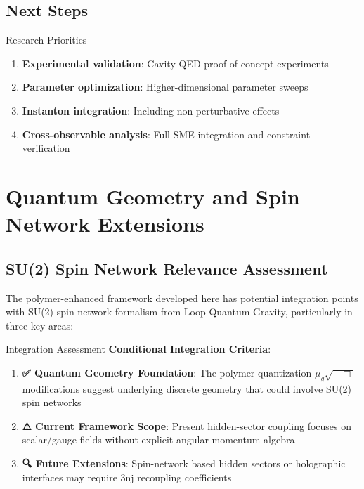 \documentclass[12pt]{article}
\begin{document}
\subsection{Next Steps}

\begin{warningbox}{Research Priorities}
\begin{enumerate}
\item \textbf{Experimental validation}: Cavity QED proof-of-concept experiments
\item \textbf{Parameter optimization}: Higher-dimensional parameter sweeps
\item \textbf{Instanton integration}: Including non-perturbative effects
\item \textbf{Cross-observable analysis}: Full SME integration and constraint verification
\end{enumerate}
\end{warningbox}

\section{Quantum Geometry and Spin Network Extensions}

\subsection{SU(2) Spin Network Relevance Assessment}

The polymer-enhanced framework developed here has potential integration points with SU(2) spin network formalism from Loop Quantum Gravity, particularly in three key areas:

\begin{warningbox}{Integration Assessment}
\textbf{Conditional Integration Criteria}:
\begin{enumerate}
\item \textbf{✅ Quantum Geometry Foundation}: The polymer quantization $\mu_g \sqrt{-\Box}$ modifications suggest underlying discrete geometry that could involve SU(2) spin networks
\item \textbf{⚠️ Current Framework Scope}: Present hidden-sector coupling focuses on scalar/gauge fields without explicit angular momentum algebra
\item \textbf{🔍 Future Extensions}: Spin-network based hidden sectors or holographic interfaces may require 3nj recoupling coefficients
\end{enumerate}
\end{warningbox}
\end{document}
